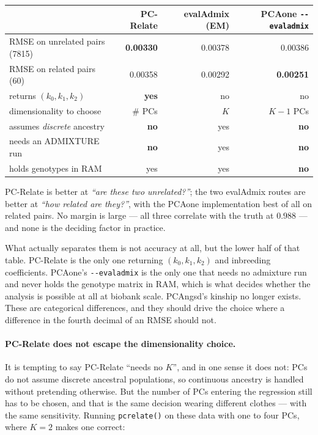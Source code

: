 \documentclass[10pt,a4paper]{article}
\begin{document}
\begin{center}
\small
\begin{tabular}{@{}lrrr@{}}
\toprule
 & \textbf{PC-Relate} & \textbf{evalAdmix (EM)} & \textbf{PCAone \texttt{-{}-evaladmix}} \\
\midrule
RMSE on unrelated pairs (7815) & \textbf{0.00330} & 0.00378 & 0.00386 \\
RMSE on related pairs (60)     & 0.00358 & 0.00292 & \textbf{0.00251} \\
returns $(k_0,k_1,k_2)$        & \textbf{yes} & no & no \\
dimensionality to choose       & \# PCs & $K$ & $K{-}1$ PCs \\
assumes \emph{discrete} ancestry & \textbf{no} & yes & \textbf{no} \\
needs an ADMIXTURE run         & \textbf{no} & yes & \textbf{no} \\
holds genotypes in RAM         & yes & yes & \textbf{no} \\
\bottomrule
\end{tabular}
\end{center}

\noindent
PC-Relate is better at \emph{``are these two unrelated?''}; the two evalAdmix routes are better at
\emph{``how related are they?''}, with the PCAone implementation best of all on related pairs. No margin is
large --- all three correlate with the truth at $0.988$ --- and none is the deciding factor in practice.

What actually separates them is not accuracy at all, but the lower half of that table. PC-Relate is the only
one returning $(k_0,k_1,k_2)$ and inbreeding coefficients. PCAone's \texttt{-{}-evaladmix} is the only one
that needs no admixture run and never holds the genotype matrix in RAM, which is what decides whether the
analysis is possible at all at biobank scale. PCAngsd's kinship no longer exists. These are categorical
differences, and they should drive the choice where a difference in the fourth decimal of an RMSE should
not.

\paragraph{PC-Relate does not escape the dimensionality choice.} It is tempting to say PC-Relate ``needs no
$K$'', and in one sense it does not: PCs do not assume discrete ancestral populations, so continuous
ancestry is handled without pretending otherwise. But the number of PCs entering the regression still has to
be chosen, and that is the same decision wearing different clothes --- with the same sensitivity. Running
\texttt{pcrelate()} on these data with one to four PCs, where $K=2$ makes one correct:
\end{document}
